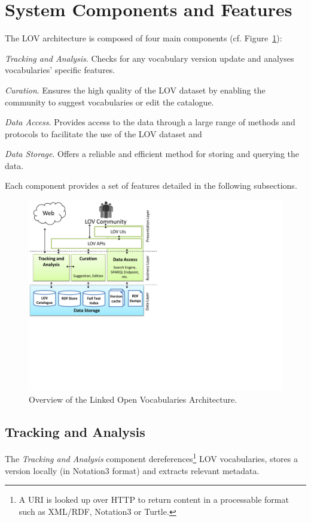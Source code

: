 \documentclass{iosart2c}
\begin{document}
\section{System Components and Features}\label{sec:arch}
	 The LOV architecture is composed of four main components (cf. Figure~\ref{fig:arch}): 
\begin{inparaenum}[1)] 
	\item \emph{Tracking and Analysis}. Checks for any vocabulary version update and analyses vocabularies' specific features.
	\item \emph{Curation}. Ensures the high quality of the LOV dataset by enabling the community to suggest vocabularies or edit the catalogue.
	\item \emph{Data Access}. Provides access to the data through a large range of methods and protocols to facilitate the use of the LOV dataset and
	\item \emph{Data Storage}. Offers a reliable and efficient method for storing and querying the data.
\end{inparaenum} 
Each component provides a set of features detailed in the following subsections.


\begin{figure}[ht!b]
\includegraphics[trim={0cm 7cm 0cm 0cm},scale=.6]{lov_architecture.pdf}
\caption{Overview of the Linked Open Vocabularies Architecture.}
\label{fig:arch}
\end{figure}

\subsection{Tracking and Analysis}
	The \emph{Tracking and Analysis} component dereferences\footnote{A URI is looked up over HTTP to return content in a processable format such as XML/RDF, Notation3 or Turtle.} LOV vocabularies, stores a version locally (in Notation3 format) and extracts relevant metadata.
\end{document}

